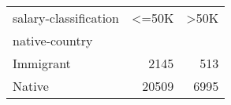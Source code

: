 \begin{tabular}{lrr}
\toprule
salary-classification &   <=50K &   >50K \\
native-country &         &        \\
\midrule
Immigrant      &    2145 &    513 \\
Native         &   20509 &   6995 \\
\bottomrule
\end{tabular}
